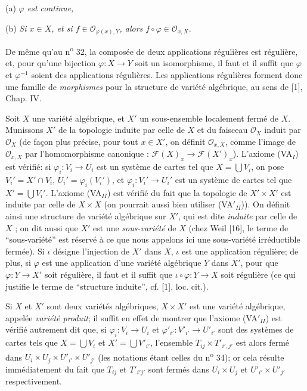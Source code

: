 (a) \textit{$\varphi$ est continue,}

(b) \textit{Si $x \in X$, et si $f \in \mathcal{O}_{\varphi(x),Y}$, alors $f \circ \varphi \in \mathcal{O}_{x,X}$.}

De même qu'au n\textsuperscript{o} 32, la composée de deux applications régulières est régulière, et, pour qu'une bijection $\varphi : X \to Y$ soit un isomorphisme, il faut et il suffit que $\varphi$ et $\varphi^{-1}$ soient des applications régulières. Les applications régulières forment donc une famille de \textit{morphismes} pour la structure de variété algébrique, au sens de [1], Chap. IV.

Soit $X$ une variété algébrique, et $X'$ un sous-ensemble localement fermé de $X$. Munissons $X'$ de la topologie induite par celle de $X$ et du faisceau $\mathcal{O}_X$ induit par $\mathcal{O}_X$ (de façon plus précise, pour tout $x \in X'$, on définit $\mathcal{O}_{x,X}$, comme l'image de $\mathcal{O}_{x,X}$ par l'homomorphisme canonique : $\mathcal{F}(X)_x \to \mathcal{F}(X')_x$). L'axiome (VA$_I$) est vérifié: si $\varphi_i : V_i \to U_i$ est un système de cartes tel que $X = \bigcup V_i$, on pose $V_i' = X' \cap V_i$, $U_i' = \varphi_i(V_i')$, et $\varphi_i : V_i' \to U_i'$ est un système de cartes tel que $X' = \bigcup V_i'$. L'axiome (VA$_{II}$) est vérifié du fait que la topologie de $X' \times X'$ est induite par celle de $X \times X$ (on pourrait aussi bien utiliser (VA$'_{II}$)). On définit ainsi une structure de variété algébrique sur $X'$, qui est dite \textit{induite} par celle de $X$ ; on dit aussi que $X'$ est une \textit{sous-variété} de $X$ (chez Weil [16], le terme de ``sous-variété'' est réservé à ce que nous appelons ici une sous-variété irréductible fermée). Si $\iota$ désigne l'injection de $X'$ dans $X$, $\iota$ est une application régulière; de plus, si $\varphi$ est une application d'une variété algébrique $Y$ dans $X'$, pour que $\varphi : Y \to X'$ soit régulière, il faut et il suffit que $\iota \circ \varphi : Y \to X$ soit régulière (ce qui justifie le terme de ``structure induite'', cf. [1], loc. cit.).

Si $X$ et $X'$ sont deux variétés algébriques, $X \times X'$ est une variété algébrique, appelée \textit{variété produit}; il suffit en effet de montrer que l'axiome (VA$'_{II}$) est vérifié autrement dit que, si $\varphi_i : V_i \to U_i$ et $\varphi'_{i'} : V'_{i'} \to U'_{i'}$ sont des systèmes de cartes tels que $X = \bigcup V_i$ et $X' = \bigcup V'_{i'}$, l'ensemble $T_{ij} \times T'_{i',j'}$ est alors fermé dans $U_i \times U_j \times U'_{i'} \times U'_{j'}$ (les notations étant celles du n\textsuperscript{o} 34); or cela résulte immédiatement du fait que $T_{ij}$ et $T'_{i'j'}$ sont fermés dans $U_i \times U_j$ et $U'_{i'} \times U'_{j'}$ respectivement.

